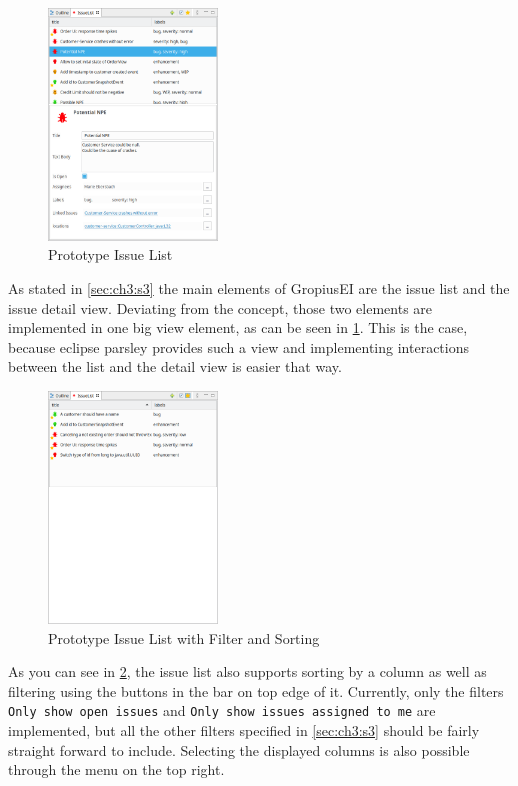 \begin{figure}[!h]
	\centering
	\includegraphics[width=0.4\textwidth]{graphics/screenshot_gropius_ei_issue_list.png}
	\caption{Prototype Issue List}
	\label{fig:c4:screenshot_issue_list}
\end{figure}
As stated in \cref{sec:ch3:s3} the main elements of \gls{GropiusEI} are the issue list and the issue detail view.
Deviating from the concept, those two elements are implemented in one big view element, as can be seen in \cref{fig:c4:screenshot_issue_list}.
This is the case, because eclipse parsley provides such a view and implementing interactions between the list and the detail view is easier that way.

\begin{figure}[!h]
	\centering
	\includegraphics[width=0.4\textwidth]{graphics/screenshot_gropius_ei_issue_list_filtered_sorted.png}
	\caption{Prototype Issue List with Filter and Sorting}
	\label{fig:c4:screenshot_issue_list_filtered_sorted}
\end{figure}
As you can see in \cref{fig:c4:screenshot_issue_list_filtered_sorted}, the issue list also supports sorting by a column as well as filtering using the buttons in the bar on top edge of it.
Currently, only the filters \lstinline|Only show open issues| and \lstinline|Only show issues assigned to me| are implemented, 
but all the other filters specified in \cref{sec:ch3:s3} should be fairly straight forward to include.
Selecting the displayed columns is also possible through the menu on the top right.

